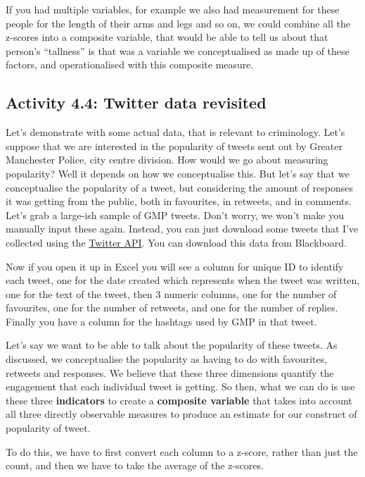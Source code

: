 \documentclass[
]{book}
\begin{document}
If you had multiple variables, for example we also had measurement for these people for the length of their arms and legs and so on, we could combine all the z-scores into a composite variable, that would be able to tell us about that person's ``tallness'' is that was a variable we conceptualised as made up of these factors, and operationalised with this composite measure.

\hypertarget{activity-4.4-twitter-data-revisited}{%
\subsection{Activity 4.4: Twitter data revisited}\label{activity-4.4-twitter-data-revisited}}

Let's demonstrate with some actual data, that is relevant to criminology. Let's suppose that we are interested in the popularity of tweets sent out by Greater Manchester Police, city centre division. How would we go about measuring popularity? Well it depends on how we conceptualise this. But let's say that we conceptualise the popularity of a tweet, but considering the amount of responses it was getting from the public, both in favourites, in retweets, and in comments. Let's grab a large-ish sample of GMP tweets. Don't worry, we won't make you manually input these again. Instead, you can just download some tweets that I've collected using the \href{https://developer.twitter.com/en/docs}{Twitter API}. You can download this data from Blackboard.

Now if you open it up in Excel you will see a column for unique ID to identify each tweet, one for the date created which represents when the tweet was written, one for the text of the tweet, then 3 numeric columns, one for the number of favourites, one for the number of retweets, and one for the number of replies. Finally you have a column for the hashtags used by GMP in that tweet.

Let's say we want to be able to talk about the popularity of these tweets. As discussed, we conceptualise the popularity as having to do with favourites, retweets and responses. We believe that these three dimensions quantify the engagement that each individual tweet is getting. So then, what we can do is use these three \textbf{indicators} to create a \textbf{composite variable} that takes into account all three directly observable measures to produce an estimate for our construct of popularity of tweet.

To do this, we have to first convert each column to a z-score, rather than just the count, and then we have to take the average of the z-scores.
\end{document}

